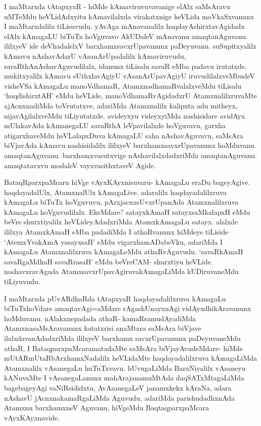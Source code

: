 \begin{artha}
I maMtarxda tAtapxyaR - hiMde kAmaviruvuvavanige elAlx saMsAravu uMTeMdu heVLidAdxyitu kAmavilalxda virakatxnige heVLida moVkaSxvanunx I maMtarxdalilx tiLisuvudu. yAvAga mAnavanalilx haqdayAshirxtavAgidadx elAlx kAmagaLU biTuTx hoVguvavo AkUDaleV mAnavanu amaqtanAguvanu. ililxyeV ide deVhadalelxV barxhamxsavxrUpavanunx paDeyuvanu. suSupitxyalilx kAmavu nAshavAdarU vAsanArUpadalilx kAmaviruvudu, savaRthAnAshavAguvudilalx, idanunx tiLisalu savaR eMba padavu irutatxde. mukitxyalilx kAmavu sUthxlavAgiyU vAsanArUpavAgiyU iruvudilalxveMbudeV visheVSa kAmagaLu manoVdhamaR, AtamxnadhamaRvalalxveMdu tiLisalu `haqdishirxtAH' eMdu heVLide, manoVdhamaRvAgidadxrU AtamxnalilxruvaMte ajAcnxnadiMda toVrutatxve, adariMda Atamxnalilx kalipxta adu mitheyx, nijavAgilalxveMdu tiLiyutatxde. avideyxyu videyxyiMda nashisidare avidAyx mUlakavAda kAmanegaLU savaRthA leVpavilalxde hoVguvavu, garxha atigarxhaveMdu heVLalapxDuva kAmagaLU saha nAshavAguvavu, saMsAra biVjavAda kAmavu nashisidalilx ililxyeV barxhamxsavxrUpavanunx hoMduvanu. amaqtanAguvanu. barxhamxvasutxvige nAshavilalxdadxriMda amaqtanAguvanu. amaqtatavxvu modaleV vayxvasithxtaveV Agide.
\end{artha}


\begin{artha}
BataqRparxpaMcaru hiVge vAyxKAyxnisuvaru- kAmagaLu eraDu bageyAgive. haqdayadalUlx, AtamxnalUlx kAmagaLive. adaralilx haqdayadalilxruva kAmagaLu biTuTx hoVguvuvu, pArxjacnxsUvxrUpanAda Atamxnalilxruva kAmagaLu hoVguvudilalx. EkeMdare? satayxkAmaH satayxsaMkalapxH eMdu beVre shurxtiyalilx heVLideyAdadxriMda AtamxkAmagaLu satayx. alalxde ililxya AtamxkAmaH eMba padadiMda I athaRvanunx hiMdeye tiLiside `AtemxYvakAmA yasayxsaH' eMdu vigarxhamADabeVku, adariMda I kAmagaLu Atamxnalilxruva kAmagaLeMdu athaRvAguvudu. `savaRkAmaH savaRgaMdhaH savaRrasaH' eMdu beVreCAM- shurxtiyu heVLide. nashavxravAgada AtamxsavxrUpavAgiruvakAmagaLiMda kUDiruvaneMdu tiLiyuvudu.

I maMtarxda pUvARdhaRda tAtapxyaR haqdayadalilxruva kAmagaLu biTuTxhoVdare amaqtavAgi=aMdare rAgashUnayxnAgi vidAyxdhikAravanunx hoMduvanu. nAlakxnepadada athaR- kamaRsamudAyadiMda AtamxnasaMsAravanunx katatxrisi anaMtara saMsAra biVjave ilalxdavanAdadxriMda ililxyeV barxhamx savxrUpavanunx paDeyuvaneMdu athaR, I BataqparxpaMcaramatadaMte saMsAra biVjayAvudeMdare- hiMde mUtARmUtaRbArxhamxNadalilx heVLidaMte haqdayadalilxruva kAmagaLiMda Atamxnalilx vAsanegaLu huTuTxvavu. hUvugaLiMda BaraNiyalilx vAsaneyu kANuvaMte I vAsanegaLanunx mahArajanamuMtAda daqSATxMtagaLiMda bagebageyAgi vaNiRsididxtu, AvAsanegaLeV janamxkekx kAraNa, adara nAshavU jAcnxnakamaRgaLiMda Aguvudu, adariMda parishudadhxnAda Atamxnu barxhamxneV Aguvanu, hiVgeMdu BaqtaqparxpaMcara vAyxKAyxnavide.
\end{artha}

